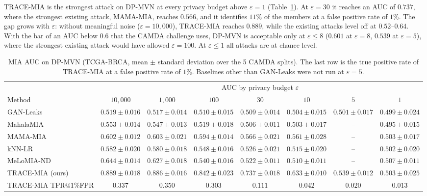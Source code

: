 \documentclass{article}
\newcommand{\dpmvn}{DP-MVN}
\newcommand{\ours}{TRACE-MIA}
\begin{document}
\ours{} is the strongest attack on \dpmvn{} at every privacy budget above $\varepsilon=1$ (Table~\ref{tab:results-dpmvn}). At $\varepsilon=30$ it reaches an AUC of $0.737$, where the strongest existing attack, MAMA-MIA, reaches $0.566$, and it identifies $11\%$ of the members at a false positive rate of $1\%$. The gap grows with $\varepsilon$: without meaningful noise ($\varepsilon=10{,}000$), \ours{} reaches $0.889$, while the existing attacks level off at $0.52$--$0.64$. With the bar of an AUC below $0.6$ that the CAMDA challenge uses, \dpmvn{} is acceptable only at $\varepsilon\le 8$ ($0.601$ at $\varepsilon=8$, $0.539$ at $\varepsilon=5$), where the strongest existing attack would have allowed $\varepsilon=100$. At $\varepsilon\le 1$ all attacks are at chance level.

\begin{table}[!h]
\centering
\caption{MIA AUC on \dpmvn{} (TCGA-BRCA, mean $\pm$ standard deviation over the 5 CAMDA splits). The last row is the true positive rate of \ours{} at a false positive rate of $1\%$. Baselines other than GAN-Leaks were not run at $\varepsilon=5$.}
\label{tab:results-dpmvn}
\small
\begin{tabular}{lccccccc}
\toprule
 & \multicolumn{7}{c}{AUC by privacy budget $\varepsilon$} \\
\cmidrule(lr){2-8}
Method & $10{,}000$ & $1{,}000$ & $100$ & $30$ & $10$ & $5$ & $1$ \\
\midrule
GAN-Leaks      & $0.519\pm0.016$ & $0.517\pm0.014$ & $0.510\pm0.015$ & $0.509\pm0.014$ & $0.504\pm0.015$ & $0.501\pm0.017$ & $0.499\pm0.024$ \\
MahalaMIA      & $0.553\pm0.014$ & $0.547\pm0.013$ & $0.519\pm0.018$ & $0.506\pm0.011$ & $0.503\pm0.017$ & -- & $0.495\pm0.015$ \\
MAMA-MIA       & $0.602\pm0.012$ & $0.603\pm0.021$ & $0.594\pm0.014$ & $0.566\pm0.021$ & $0.561\pm0.028$ & -- & $0.503\pm0.017$ \\
kNN-LR         & $0.582\pm0.020$ & $0.580\pm0.018$ & $0.548\pm0.016$ & $0.526\pm0.021$ & $0.515\pm0.020$ & -- & $0.502\pm0.020$ \\
MeLoMIA-ND     & $0.644\pm0.014$ & $0.627\pm0.018$ & $0.540\pm0.016$ & $0.522\pm0.011$ & $0.510\pm0.011$ & -- & $\mathbf{0.507\pm0.011}$ \\
\ours{} (ours) & $\mathbf{0.889\pm0.018}$ & $\mathbf{0.886\pm0.016}$ & $\mathbf{0.842\pm0.023}$ & $\mathbf{0.737\pm0.018}$ & $\mathbf{0.633\pm0.010}$ & $\mathbf{0.539\pm0.012}$ & $0.503\pm0.025$ \\
\midrule
\ours{} TPR@1\%FPR & $0.337$ & $0.350$ & $0.303$ & $0.111$ & $0.042$ & $0.020$ & $0.013$ \\
\bottomrule
\end{tabular}
\end{table}
\end{document}
